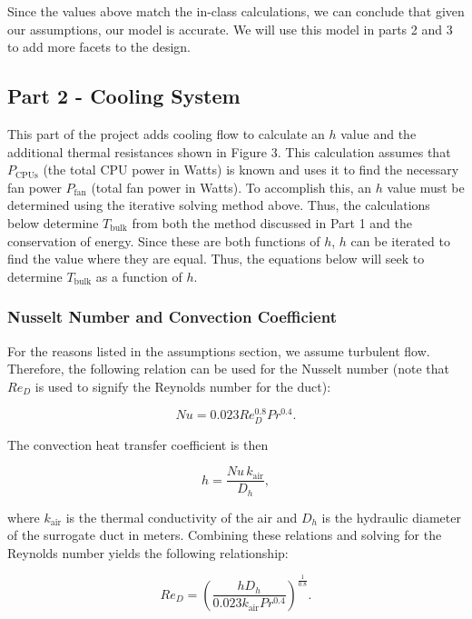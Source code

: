 \documentclass[12pt, titlepage]{article}
\begin{document}
Since the values above match the in-class calculations, we can conclude that given our assumptions, our model is accurate. We will use this model in parts 2 and 3 to add more facets to the design.

\subsection{Part 2 - Cooling System}

This part of the project adds cooling flow to calculate an $h$ value and the additional thermal resistances shown in Figure 3. This calculation assumes that $P_{\text{CPUs}}$ (the total CPU power in Watts) is known and uses it to find the necessary fan power $P_{\text{fan}}$ (total fan power in Watts). To accomplish this, an $h$ value must be determined using the iterative solving method above. Thus, the calculations below determine $T_{\text{bulk}}$ from both the method discussed in Part 1 and the conservation of energy. Since these are both functions of $h$, $h$ can be iterated to find the value where they are equal. Thus, the equations below will seek to determine $T_{\text{bulk}}$ as a function of $h$.

\subsubsection{Nusselt Number and Convection Coefficient}

For the reasons listed in the assumptions section, we assume turbulent flow. Therefore, the following relation can be used for the Nusselt number (note that $Re_D$ is used to signify the Reynolds number for the duct):

\begin{equation}
Nu = 0.023 Re_D^{0.8} Pr^{0.4}.
\end{equation}

The convection heat transfer coefficient is then

\begin{equation}
h = \frac{Nu \, k_{\text{air}}}{D_h},
\end{equation}

where $k_{\text{air}}$ is the thermal conductivity of the air and $D_h$ is the hydraulic diameter of the surrogate duct in meters. Combining these relations and solving for the Reynolds number yields the following relationship:

\begin{equation}
Re_D = \left(\frac{hD_h}{0.023 k_{\text{air}} Pr^{0.4}}\right)^{\frac{1}{0.8}}.
\label{eq:re}
\end{equation}
\end{document}
